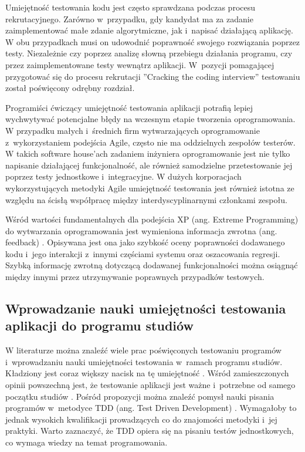 Umiejętność testowania kodu jest często sprawdzana podczas procesu rekrutacyjnego.
Zarówno w~przypadku, gdy kandydat ma za zadanie zaimplementować małe zdanie algorytmiczne, jak i~napisać działającą aplikację.
W obu przypadkach musi on udowodnić poprawność swojego rozwiązania poprzez testy.
Niezależnie czy poprzez analizę słowną przebiegu działania programu, czy przez zaimplementowane testy wewnątrz aplikacji.
W~pozycji pomagającej przygotować się do procesu rekrutacji ”Cracking the coding interview” \cite{cracking-the-coding-interview} testowaniu został poświęcony odrębny rozdział.

Programiści ćwiczący umiejętność testowania aplikacji potrafią lepiej wychwytywać potencjalne błędy na wczesnym etapie tworzenia oprogramowania.
W przypadku małych i~średnich firm wytwarzających oprogramowanie z~wykorzystaniem podejścia Agile, często nie ma oddzielnych zespołów testerów.
W takich software house'ach zadaniem inżyniera oprogramowanie jest nie tylko napisanie działającej funkcjonalność, ale również samodzielne przetestowanie jej poprzez testy jednostkowe i~integracyjne.
W dużych korporacjach wykorzystujących metodyki Agile umiejętność testowania jest również istotna ze względu na ścisłą współpracę między interdyscyplinarnymi członkami zespołu.

Wśród wartości fundamentalnych dla podejścia XP (ang. Extreme Programming) do wytwarzania oprogramowania jest wymieniona informacja zwrotna (ang. feedback) \cite{extreem-programming}.
Opisywana jest ona jako szybkość oceny poprawności dodawanego kodu i~jego interakcji z~innymi częściami systemu oraz oszacowania regresji.
Szybką informację zwrotną dotyczącą dodawanej funkcjonalności można osiągnąć między innymi przez utrzymywanie poprawnych przypadków testowych.

\subsection{Wprowadzanie nauki umiejętności testowania aplikacji do programu studiów}
\label{test_studies}

W literaturze można znaleźć wiele prac poświęconych testowaniu programów i~wprowadzaniu nauki umiejętności testowania w~ramach programu studiów.
Kładziony jest coraz większy nacisk na tę umiejętność \cite{tests-important}.
Wśród zamieszczonych opinii powszechną jest, że testowanie aplikacji jest ważne i~potrzebne od samego początku studiów \cite{test-from-scratch}.
Pośród propozycji można znaleźć pomysł nauki pisania programów w~metodyce TDD (ang. Test Driven Development) \cite{tdd-on-start}.
Wymagałoby to jednak wysokich kwalifikacji prowadzących co do znajomości metodyki i~jej praktyki.
Warto zaznaczyć, że TDD opiera się na pisaniu testów jednostkowych, co wymaga wiedzy na temat programowania.

